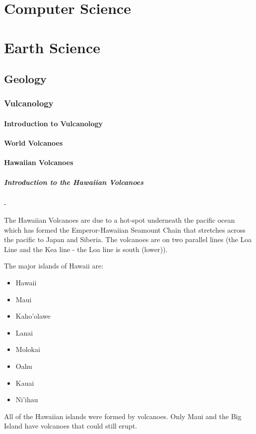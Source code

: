 \documentclass[12pt]{book}
\begin{document}
	\section{Computer Science}
	\newpage
	\section{Earth Science}
		\subsection{Geology}
			\subsubsection{Vulcanology}
			\paragraph{Introduction to Vulcanology}
			\paragraph{World Volcanoes}
			\newpage
			\paragraph{Hawaiian Volcanoes}
				\subparagraph{Introduction to the Hawaiian Volcanoes} - 

					The Hawaiian Volcanoes are due to a hot-spot underneath the pacific ocean which has formed the Emperor-Hawaiian Seamount Chain that stretches across the pacific to Japan and Siberia.  The volcanoes are on two parallel lines (the Loa Line and the Kea line - the Loa line is south (lower)).   

					The major islands of Hawaii are: 
					\begin{multicols}{2}
					\begin{itemize}
						\item Hawaii
						\item Maui
						\item Kaho'olawe
						\item Lanai
						\item Molokai
						\item Oahu
						\item Kauai
						\item Ni'ihau
					\end{itemize}
					\end{multicols}
					All of the Hawaiian islands were formed by volcanoes.  Only Maui and the Big Island have volcanoes that could still erupt.  
\end{document}

